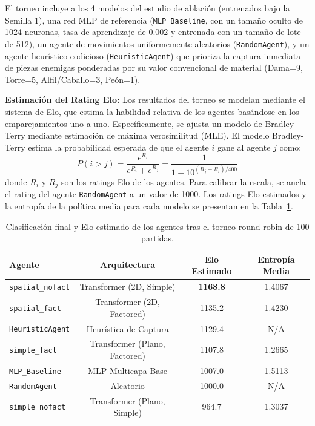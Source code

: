\documentclass[12pt, a4paper]{article}
\let\cite\supercite
\begin{document}
El torneo incluye a los 4 modelos del estudio de ablación (entrenados bajo la Semilla 1), una red MLP de referencia (\texttt{MLP\_Baseline}, con un tamaño oculto de 1024 neuronas, tasa de aprendizaje de 0.002 y entrenada con un tamaño de lote de 512), un agente de movimientos uniformemente aleatorios (\texttt{RandomAgent}), y un agente heurístico codicioso (\texttt{HeuristicAgent}) que prioriza la captura inmediata de piezas enemigas ponderadas por su valor convencional de material (Dama=9, Torre=5, Alfil/Caballo=3, Peón=1).

\textbf{Estimación del Rating Elo:}
Los resultados del torneo se modelan mediante el sistema de Elo, que estima la habilidad relativa de los agentes basándose en los emparejamientos uno a uno. Específicamente, se ajusta un modelo de Bradley-Terry mediante estimación de máxima verosimilitud (MLE). El modelo Bradley-Terry estima la probabilidad esperada de que el agente $i$ gane al agente $j$ \cite{bradley_terry_model_for_elo_rating_system} como:
$$P(i > j) = \frac{e^{R_i}}{e^{R_i} + e^{R_j}} = \frac{1}{1 + 10^{(R_j - R_i)/400}}$$
donde $R_i$ y $R_j$ son los ratings Elo de los agentes. Para calibrar la escala, se ancla el rating del agente \texttt{RandomAgent} a un valor de 1000. Los ratings Elo estimados y la entropía de la política media para cada modelo se presentan en la Tabla~\ref{tab:elo_tournament}.

\begin{table}[htbp]
    \centering
    \small
    \setlength{\tabcolsep}{10pt}
    \begin{tabular}{|l|c|c|c|}
    \hline
    \textbf{Agente} & \textbf{Arquitectura} & \textbf{Elo Estimado} & \textbf{Entropía Media} \\
    \hline
    \texttt{spatial\_nofact} & Transformer (2D, Simple) & \textbf{1168.8} & 1.4067 \\
    \texttt{spatial\_fact} & Transformer (2D, Factored) & 1135.2 & 1.4230 \\
    \texttt{HeuristicAgent} & Heurística de Captura & 1129.4 & N/A \\
    \texttt{simple\_fact} & Transformer (Plano, Factored) & 1107.8 & 1.2665 \\
    \texttt{MLP\_Baseline} & MLP Multicapa Base & 1007.0 & 1.5113 \\
    \texttt{RandomAgent} & Aleatorio & 1000.0 & N/A \\
    \texttt{simple\_nofact} & Transformer (Plano, Simple) & 964.7 & 1.3037 \\
    \hline
    \end{tabular}
    \caption[Resultados del torneo de 100 partidas]{Clasificación final y Elo estimado de los agentes tras el torneo round-robin de 100 partidas.}
    \label{tab:elo_tournament}
\end{table}
\end{document}
